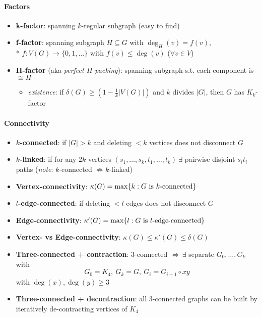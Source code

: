 


\paragraph{Factors}
\begin{itemize}
  \item \textbf{k-factor}: spanning $ k $-regular subgraph (easy to find) 
  \item \textbf{f-factor}: spanning subgraph $ H \subseteq G $ with $ \deg_H(v) = f(v) $, \\*
    $ f: V(G) \to \{ 0,1,\dots \} $ with $ f(v) \leq \deg(v) $ \quad ($ \forall v \in V $)
  \item \textbf{H-factor} (aka \emph{perfect $ H $-packing}): spanning subgraph s.t. each component is $ \cong H $
  \begin{itemize}
    \item \emph{existence}: if $ \delta(G) \geq \left( 1 - \tfrac{1}{k}\vert V(G) \vert \right) $ and $ k $ divides $ \vert G \vert $, then $ G $ has $ K_k $-factor
  \end{itemize}
\end{itemize}

\paragraph{Connectivity}
\begin{itemize}
  \item \textbf{$ k $-connected}: if $ \vert G \vert > k $ and deleting $ < k $ vertices does not disconnect $ G $
  \item \textbf{$ k $-linked}: if for any $ 2k $ vertices $ (s_1, \dots, s_k, t_1, \dots, t_k) \ \exists $ pairwise disjoint $ s_it_i $-paths (\emph{note}: $ k $-connected $ \not \Rightarrow k $-linked)
  \item \textbf{Vertex-connectivity}: $ \kappa(G) = \max\{ k : \text{$ G $ is $ k $-connected} \} $
  \item \textbf{$ l $-edge-connected}: if deleting $ < l $ edges does not disconnect $ G $
  \item \textbf{Edge-connectivity}: $ \kappa'(G) = \max\{ l : \text{$ G $ is $ l $-edge-connected} \} $
  \item \textbf{Vertex- vs Edge-connectivity}: $ \kappa(G) \leq \kappa'(G) \leq \delta(G) $
  \item \textbf{Three-connected + contraction}: $ 3 $-connected $ \Leftrightarrow \ \exists $ separate $ G_0, \dots, G_k $ with
  \begin{equation*}
    G_0 = K_4, \ G_k = G, \ G_i = G_{i+1} \circ xy
  \end{equation*}
  with $ \deg(x), \deg(y) \geq 3 $
  \item \textbf{Three-connected + decontraction}: all $ 3 $-connected graphs can be built by iteratively de-contracting vertices of $ K_4 $
\end{itemize}

